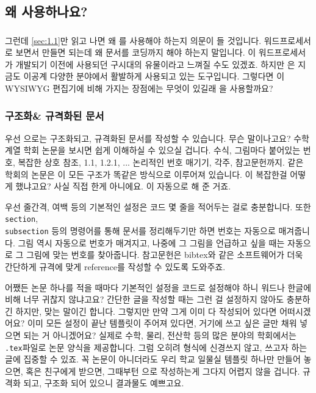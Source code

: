 \subsection{왜  사용하나요?}
\label{sec:1.2}
\subsubsection*{}
그런데 \ref{sec:1.1}만 읽고 나면 왜 \lt 를 사용해야 하는지 의문이 들 것입니다.
워드프로세서로 보면서 만들면 되는데 왜 문서를 코딩까지 해야 하는지 말입니다.
\lt 이 워드프로세서가 개발되기 이전에 사용되던 구시대의 유물이라고 느껴질 수도 있겠죠.
하지만 \lt 은 지금도 이공계 다양한 분야에서 활발하게 사용되고 있는 도구입니다.
그렇다면 \lt 이  WYSIWYG 편집기에 비해 가지는 장점에는 무엇이 있길래 \lt 을 사용할까요?

\subsubsection{구조화\& 규격화된 문서}
\label{sec:1.2-org}

우선 \lt 으로는 구조화되고, 규격화된 문서를 작성할 수 있습니다.
무슨 말이나고요?
수학 계열 학회 논문을 보시면 쉽게 이해하실 수 있으실 겁니다.
수식, 그림마다 붙어있는 번호, 복잡한 상호 참조, 1.1, 1.2.1, ... 논리적인 번호 매기기, 각주, 참고문헌까지.
같은 학회의 논문은 이 모든 구조가 똑같은 방식으로 이루어져 있습니다.
이 복잡한걸 어떻게 했냐고요?
사실 직접 한게 아니에요.
\lt 이 자동으로 해 준 거죠.

우선 줄간격, 여백 등의 기본적인 설정은 코드 몇 줄을 적어두는 걸로 충분합니다.
또한 \verb|section|, \\ \verb|subsection| 등의 명령어를 통해 문서를 정리해두기만 하면 번호는  자동으로 매겨줍니다.
그림 역시 자동으로 번호가 매겨지고, 나중에 그 그림을 언급하고 싶을 때는 자동으로 그 그림에 맞는 번호를 찾아줍니다.
참고문헌은 bibtex와 같은 소프트웨어가 더욱 간단하게 규격에 맞게 reference를 작성할 수 있도록 도와주죠.

어쨌든 논문 하나를 적을 때마다 기본적인 설정을 코드로 설정해야 하니 워드나 한글에 비해 너무 귀찮지 않냐고요?
간단한 글을 작성할 때는 그런 걸 설정하지 않아도 충분하긴 하지만, 맞는 말이긴 합니다.
그렇지만 만약 그게 이미 다 작성되어 있다면 어떠시겠어요?
이미 모든 설정이 끝난 템플릿이 주어져 있다면, 거기에 쓰고 싶은 글만 채워 넣으면 되는 거 아니겠어요?
실제로 수학, 물리, 전산학 등의 많은 분야의 학회에서는  \verb|.tex|파일로 논문 양식을 제공합니다.
그럼 오히려 형식에 신경쓰지 않고, 쓰고자 하는 글에 집중할 수 있죠.
꼭 논문이 아니더라도 우리 학교 일물실 템플릿 하나만 만들어 놓으면, 혹은 친구에게 받으면, 그때부턴 \lt 으로 작성하는게 그다지 어렵지 않을 겁니다. 규격화 되고, 구조화 되어 있으니 결과물도 예쁘고요.

